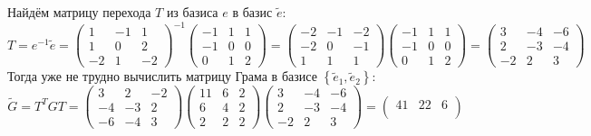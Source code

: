 \documentclass{article}
\begin{document}
\begin{center}
    Найдём матрицу перехода $T$ из базиса $e$ в базис $\tilde{e}$:
    $$
        T = e^{-1}\tilde{e} = \begin{pmatrix}
            1  & -1 & 1  \\
            1  & 0  & 2  \\
            -2 & 1  & -2
        \end{pmatrix}^{-1}\begin{pmatrix}
            -1 & 1 & 1 \\
            -1 & 0 & 0 \\
            0  & 1 & 2
        \end{pmatrix} = \begin{pmatrix}
            -2 & -1 & -2 \\
            -2 & 0  & -1 \\
            1  & 1  & 1
        \end{pmatrix}\begin{pmatrix}
            -1 & 1 & 1 \\
            -1 & 0 & 0 \\
            0  & 1 & 2
        \end{pmatrix} = \begin{pmatrix}
            3  & -4 & -6 \\
            2  & -3 & -4 \\
            -2 & 2  & 3
        \end{pmatrix}
    $$
    Тогда уже не трудно вычислить матрицу Грама в базисе $\left\{\tilde{e}_1, \tilde{e}_2\right\}$:
    $$
        \tilde{G} = T^{T}GT = \begin{pmatrix}
            3  & 2  & -2 \\
            -4 & -3 & 2  \\
            -6 & -4 & 3
        \end{pmatrix}\begin{pmatrix}
            11 & 6 & 2 \\
            6  & 4 & 2 \\
            2  & 2 & 2
        \end{pmatrix}\begin{pmatrix}
            3  & -4 & -6 \\
            2  & -3 & -4 \\
            -2 & 2  & 3
        \end{pmatrix} = \begin{pmatrix}
            41  & 22  & 6   \\

\end{pmatrix}$$
\end{center}
\end{document}
